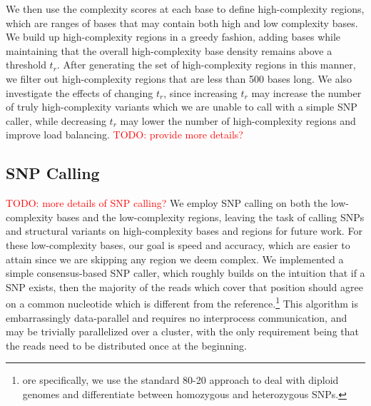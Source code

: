 \documentclass[10pt]{article}
\newcommand\TODO[1]{\textcolor{red}{TODO: #1}}
\begin{document}
We then use the complexity scores at each base to define high-complexity regions, which are ranges of bases that may contain both high and low complexity bases.
We build up high-complexity regions in a greedy fashion, adding bases while maintaining that the overall high-complexity base density remains above a threshold $t_r$.
After generating the set of high-complexity regions in this manner, we filter out high-complexity regions that are less than 500 bases long.
We also investigate the effects of changing $t_r$, since increasing $t_r$ may increase the number of truly high-complexity variants which we are unable to call with a simple SNP caller, while decreasing $t_r$ may lower the number of high-complexity regions and improve load balancing.
\TODO{provide more details?}

\subsection{SNP Calling}

\TODO{more details of SNP calling?}
We employ SNP calling on both the low-complexity bases and the low-complexity regions, leaving the task of calling SNPs and structural variants on high-complexity bases and regions for future work.
For these low-complexity bases, our goal is speed and accuracy, which are easier to attain since we are skipping any region we deem complex.
We implemented a simple consensus-based SNP caller, which roughly builds on the intuition that if a SNP exists, then the majority of the reads which cover that position should agree on a common nucleotide which is different from the reference.\footnote{ore specifically, we use the standard 80-20 approach \cite{gatk} to deal with diploid genomes and differentiate between homozygous and heterozygous SNPs.}
This algorithm is embarrassingly data-parallel and requires no interprocess communication, and may be trivially parallelized over a cluster, with the only requirement being that the reads need to be distributed once at the beginning.
\end{document}
